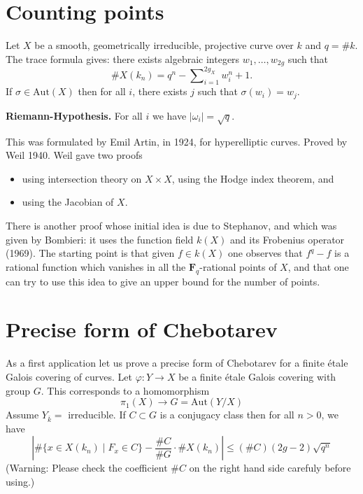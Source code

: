 \section{Counting points}
\label{section-counting}

\noindent
Let $X$ be a smooth, geometrically irreducible,
projective curve over $k$ and $q = \# k$. The trace formula gives:
there exists algebraic integers $w_1, \ldots, w_{2g}$ such that
$$
\# X(k_n) = q^n - \sum\nolimits_{i = 1}^{2g_X} w_i^n + 1.
$$
If $\sigma\in \text{Aut}(X)$ then for all $i$, there exists $j$ such that
$\sigma(w_i)=w_j$.

\medskip\noindent
{\bf Riemann-Hypothesis.} For all $i$ we have $|\omega_i| = \sqrt{q}$.

\medskip\noindent
This was formulated by Emil Artin, in 1924, for
hyperelliptic curves. Proved by Weil 1940. Weil gave two proofs
\begin{itemize}
\item using intersection theory on $X \times X$, using the
Hodge index theorem, and
\item using the Jacobian of $X$.
\end{itemize}
There is another proof whose initial idea is due to Stephanov, and
which was given by Bombieri: it uses the function field $k(X)$ and
its Frobenius operator (1969). The starting point is that given
$f\in k(X)$ one observes that $f^q - f$ is a rational function which
vanishes in all the $\mathbf{F}_q$-rational points of $X$, and that one
can try to use this idea to give an upper bound for the number of points.


\section{Precise form of Chebotarev}
\label{section-chebotarev}

\noindent
As a first application let us prove a precise form of Chebotarev
for a finite \'etale Galois covering of curves.
Let $\varphi : Y \to X$ be a finite \'etale Galois covering with
group $G$. This corresponds to a homomorphism
$$
\pi_1(X) \longrightarrow G = \text{Aut}(Y/X)
$$
Assume $Y_{\overline{k}} = $ irreducible. If $C\subset G$ is a conjugacy
class then for all $n>0$, we have
$$
| \# \{x \in X(k_n) \mid F_x \in C\} - \frac{\# C}{\# G} \cdot \# X(k_n) |
\leq
(\# C)(2g - 2) \sqrt{q^n}
$$
(Warning: Please check the coefficient $\# C$ on the right hand side
carefuly before using.)

